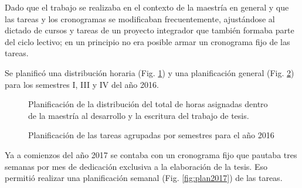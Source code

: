 Dado que el trabajo se realizaba en el contexto de la maestr\'ia en general y que las tareas y los cronogramas se modificaban frecuentemente, ajust\'andose al dictado de cursos y tareas de un proyecto integrador que tambi\'en formaba parte del ciclo lectivo; en un principio no era posible armar un cronograma fijo de las tareas.

Se planific\'o una distribuci\'on horaria (Fig. \ref{fig:disths}) y una planificaci\'on general (Fig. \ref{fig:plan2016}) para los semestres I, III y IV del año 2016.

\begin{figure}[!h]
  \centering
  \caption{Planificaci\'on de la distribuci\'on del total de horas asignadas dentro de la maestr\'ia al desarrollo y la escritura del trabajo de tesis.}
  \label{fig:disths}
\end{figure}

\begin{figure}[H]
  \centering
  \caption{Planificaci\'on de las tareas agrupadas por semestres para el año 2016}
  \label{fig:plan2016}
\end{figure}

Ya a comienzos del año 2017 se contaba con un cronograma fijo que pautaba tres semanas por mes de dedicaci\'on exclusiva a la elaboraci\'on de la tesis. Eso permiti\'o realizar una planificaci\'on semanal (Fig. \ref{fig:plan2017}) de las tareas. 

